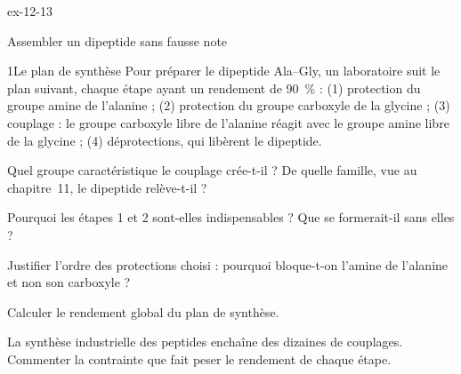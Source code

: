 \begin{blocLivre}{ex-12-13}
\begin{exercice}[3]{Assembler un dipeptide sans fausse note}
\begin{docu}{1}{Le plan de synthèse}
Pour préparer le dipeptide Ala--Gly, un laboratoire suit le plan suivant, chaque étape ayant un rendement de 90~\% :
(1) protection du groupe amine de l'alanine ; (2) protection du groupe carboxyle de la glycine ; (3) couplage : le
groupe carboxyle libre de l'alanine réagit avec le groupe amine libre de la glycine ; (4) déprotections, qui libèrent
le dipeptide.
\end{docu}
\begin{questions}
\item Quel groupe caractéristique le couplage crée-t-il ? De quelle famille, vue au chapitre~11, le dipeptide
relève-t-il ?
\item Pourquoi les étapes 1 et 2 sont-elles indispensables ? Que se formerait-il sans elles ?
\item Justifier l'ordre des protections choisi : pourquoi bloque-t-on l'amine de l'alanine et non son carboxyle ?
\item \initiative Calculer le rendement global du plan de synthèse.
\item La synthèse industrielle des peptides enchaîne des dizaines de couplages. Commenter la contrainte que fait peser
le rendement de chaque étape.
\end{questions}
\end{exercice}
\end{blocLivre}
